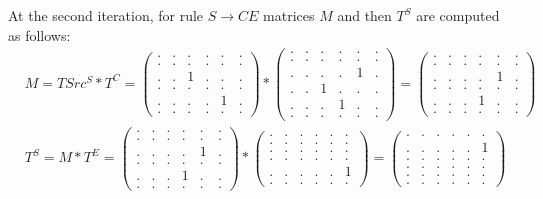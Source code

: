 At the second iteration, for rule $S \to C E$ matrices $M$ and then $T^S$ are computed as follows: 
{
    \renewcommand{\arraystretch}{0.7}
    \setlength\arraycolsep{2pt}
\begin{align*}
&M = TSrc^S * T^C =
\begin{pmatrix}
    . & . & . & . & . & . \\
    . & . & . & . & . & . \\
    . & . & 1 & . & . & . \\
    . & . & . & . & . & . \\ 
    . & . & . & . & 1 & . \\ 
    . & . & . & . & . & .
\end{pmatrix} * 
\begin{pmatrix}
    . & . & . & . & . & . \\
    . & . & . & . & . & . \\
    . & . & . & . & 1 & . \\
    . & . & 1 & . & . & . \\ 
    . & . & . & 1 & . & . \\ 
    . & . & . & . & . & .
\end{pmatrix}=
\begin{pmatrix}
    . & . & . & . & . & . \\
    . & . & . & . & . & . \\
    . & . & . & . & 1 & . \\
    . & . & . & . & . & . \\ 
    . & . & . & 1 & . & . \\ 
    . & . & . & . & . & .
\end{pmatrix}
\\
&T^S = M * T^E =
\begin{pmatrix}
    . & . & . & . & . & . \\
    . & . & . & . & . & . \\
    . & . & . & . & 1 & . \\
    . & . & . & . & . & . \\ 
    . & . & . & 1 & . & . \\ 
    . & . & . & . & . & .
\end{pmatrix} * 
\begin{pmatrix}
    . & . & . & . & . & . \\
    . & . & . & . & . & . \\
    . & . & . & . & . & . \\
    . & . & . & . & . & . \\ 
    . & . & . & . & . & 1 \\ 
    . & . & . & . & . & .
\end{pmatrix} =
\begin{pmatrix}
    . & . & . & . & . & . \\
    . & . & . & . & . & 1 \\
    . & . & . & . & . & . \\
    . & . & . & . & . & . \\ 
    . & . & . & . & . & . \\ 
    . & . & . & . & . & .
\end{pmatrix}
\end{align*} 
}

